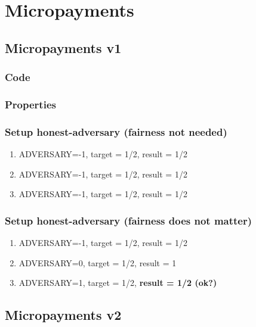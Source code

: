 
\section{Micropayments}

\subsection{Micropayments v1}

\subsubsection{Code}



\subsubsection{Properties}



\subsubsection{Setup honest-adversary (fairness not needed)}

\begin{enumerate}
\item ADVERSARY=-1, target = 1/2, result = 1/2
\item ADVERSARY=-1, target = 1/2, result = 1/2
\item ADVERSARY=-1, target = 1/2, result = 1/2
\end{enumerate}

\subsubsection{Setup honest-adversary (fairness does not matter)}

\begin{enumerate}
\item ADVERSARY=-1, target = 1/2, result = 1/2
\item ADVERSARY=0, target = 1/2, result = 1
\item ADVERSARY=1, target = 1/2, \textbf{result = 1/2 (ok?)}
\end{enumerate}

\subsection{Micropayments v2}

